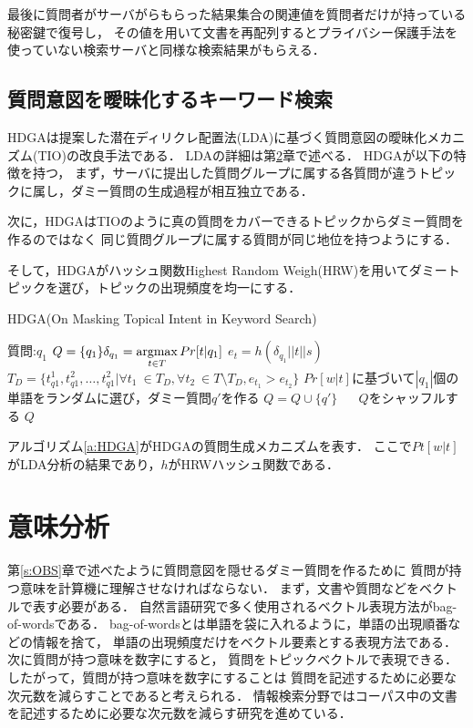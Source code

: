 \documentclass[master]{suribt}
\theoremstyle{definition}
\newcommand{\argmax}{\mathop{\rm argmax}\limits}
\begin{document}
 最後に質問者がサーバがらもらった結果集合の関連値を質問者だけが持っている秘密鍵で復号し，
 その値を用いて文書を再配列するとプライバシー保護手法を使っていない検索サーバと同様な検索結果がもらえる．

 \section{質問意図を曖昧化するキーワード検索} \label{s:HDGA}

 HDGAは\cite{oti2012}提案した潜在ディリクレ配置法(LDA)\cite{lda2003}に基づく質問意図の曖昧化メカニズム(TIO)の改良手法である．
 LDAの詳細は第\ref{s:sm}章で述べる．
 HDGAが以下の特徴を持つ，
 まず，サーバに提出した質問グループに属する各質問が違うトピックに属し，ダミー質問の生成過程が相互独立である．

 次に，HDGAはTIOのように真の質問をカバーできるトピックからダミー質問を作るのではなく
 同じ質問グループに属する質問が同じ地位を持つようにする．

 そして，HDGAがハッシュ関数Highest Random Weigh(HRW)\cite{hrw1998}を用いてダミートピックを選び，トピックの出現頻度を均一にする．

 \begin{algorithm}
 \caption{HDGA(On Masking Topical Intent in Keyword Search)}
 \begin{algorithmic}[1]
  \Require 質問:$q_1$
  \State $Q = \{q_1\}\delta_{q_1} = \argmax_{t \in T} Pr[t|q_1]$
  \State $e_t = h(\delta_{q_1}||t||s)$
  \EndFor
  \State $T_D = \{t^1_{q1},t^2_{q1}, \dots , t^2_{q1} | \forall t_1 \ \in T_D , \forall t_2 \ \in T \setminus T_D, e_{t_1} > e_{t_2} \}$
  \While { $ \argmax_{t \in T} Pr[t|q'] \neq t$}
  \State $Pr[w|t]$に基づいて$|q_1|$個の単語をランダムに選び，ダミー質問$q'$を作る
  \EndWhile
  \State $Q = Q \cup \{q'\}$
  \EndFor　
  \State $Q$をシャッフルする
  \Ensure $Q$
 \end{algorithmic}
 \label{a:HDGA}
 \end{algorithm}

 アルゴリズム\ref{a:HDGA}がHDGAの質問生成メカニズムを表す．
 ここで$Pt[w|t]$がLDA分析の結果であり，$h$がHRWハッシュ関数である．

 \chapter{意味分析} \label{s:sm}
 第\ref{s:OBS}章で述べたように質問意図を隠せるダミー質問を作るために
 質問が持つ意味を計算機に理解させなければならない．
 まず，文書や質問などをベクトルで表す必要がある．
 自然言語研究で多く使用されるベクトル表現方法がbag-of-wordsである．
 bag-of-wordsとは単語を袋に入れるように，単語の出現順番などの情報を捨て，
 単語の出現頻度だけをベクトル要素とする表現方法である．
 次に質問が持つ意味を数字にすると，
 質問をトピックベクトルで表現できる．
 したがって，質問が持つ意味を数字にすることは
 質問を記述するために必要な次元数を減らすことであると考えられる．
 情報検索分野ではコーパス中の文書を記述するために必要な次元数を減らす研究を進めている．
\end{document}
